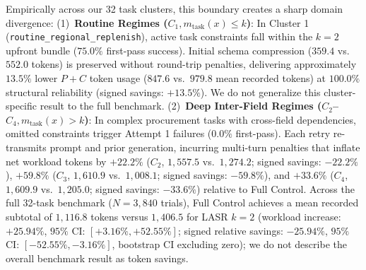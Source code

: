 Empirically across our 32 task clusters, this boundary creates a sharp domain divergence: (1)~\textbf{Routine Regimes ($C_1, m_{\text{task}}(x) \le k$)}: In Cluster 1 (\texttt{routine\_regional\_replenish}), active task constraints fall within the $k=2$ upfront bundle ($75.0\%$ first-pass success). Initial schema compression ($359.4$ vs.\ $552.0$ tokens) is preserved without round-trip penalties, delivering approximately $\mathbf{13.5\%}$ lower $P+C$ token usage ($847.6$ vs.\ $979.8$ mean recorded tokens) at $100.0\%$ structural reliability (signed savings: $+13.5\%$). We do not generalize this cluster-specific result to the full benchmark. (2)~\textbf{Deep Inter-Field Regimes ($C_2$--$C_4, m_{\text{task}}(x) > k$)}: In complex procurement tasks with cross-field dependencies, omitted constraints trigger Attempt 1 failures ($0.0\%$ first-pass). Each retry re-transmits prompt and prior generation, incurring multi-turn penalties that inflate net workload tokens by $+22.2\%$ ($C_2$, $1,557.5$ vs.\ $1,274.2$; signed savings: $-22.2\%$), $+59.8\%$ ($C_3$, $1,610.9$ vs.\ $1,008.1$; signed savings: $-59.8\%$), and $+33.6\%$ ($C_4$, $1,609.9$ vs.\ $1,205.0$; signed savings: $-33.6\%$) relative to Full Control. Across the full 32-task benchmark ($N=3,840$ trials), Full Control achieves a mean recorded subtotal of $1,116.8$ tokens versus $1,406.5$ for LASR $k=2$ (workload increase: $+25.94\%$, $95\%$ CI: $[+3.16\%, +52.55\%]$; signed relative savings: $-25.94\%$, $95\%$ CI: $[-52.55\%, -3.16\%]$, bootstrap CI excluding zero); we do not describe the overall benchmark result as token savings.

